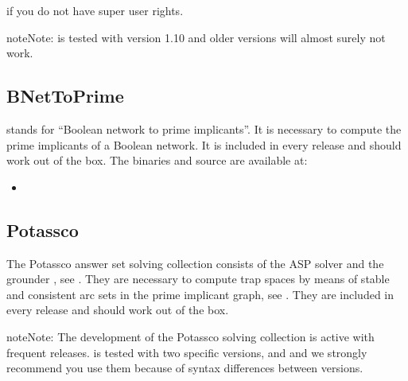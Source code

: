 \documentclass[letterpaper,10pt,english]{sphinxmanual}
\begin{document}
if you do not have super user rights.

\begin{sphinxadmonition}{note}{Note:}
 is tested with  version 1.10 and older versions will almost surely not work.
\end{sphinxadmonition}


\subsection{BNetToPrime}
\label{\detokenize{Installation:bnettoprime}}\label{\detokenize{Installation:installation-bnettoprime}}
 stands for “Boolean network to prime implicants”. It is necessary to compute the prime implicants of a Boolean network. It is included in every release and should work out of the box. The binaries and source are available at:
\begin{itemize}
\item {} 

\end{itemize}


\subsection{Potassco}
\label{\detokenize{Installation:installation-potassco}}\label{\detokenize{Installation:potassco}}
The Potassco answer set solving collection consists of the ASP solver  and the grounder , see {\hyperref[\detokenize{Bibliography:gebser2011}]{}}.
They are necessary to compute trap spaces by means of stable and consistent arc sets in the prime implicant graph, see {\hyperref[\detokenize{Bibliography:klarner2015trap}]{}}. They are included in every release and should work out of the box.

\begin{sphinxadmonition}{note}{Note:}
The development of the Potassco solving collection is active with frequent releases.
 is tested with two specific versions,  and  and we strongly recommend you use them because of syntax differences between versions.
\end{sphinxadmonition}
\end{document}
